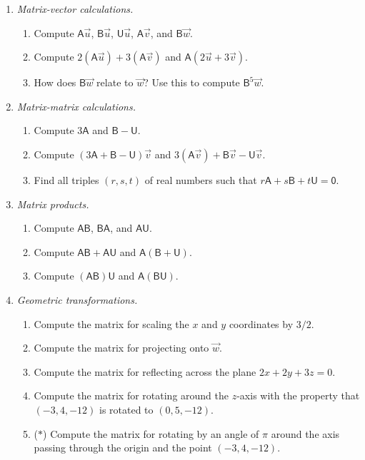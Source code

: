 \begin{enumerate}
\item \emph{Matrix-vector calculations.}
\begin{enumerate}
\item Compute $\mathsf{A}\vec{u}$, $\mathsf{B}\vec{u}$, $\mathsf{U}\vec{u}$, $\mathsf{A}\vec{v}$, and $\mathsf{B}\vec{w}$.
\item Compute $2(\mathsf{A}\vec{u}) + 3(\mathsf{A}\vec{v})$ and $\mathsf{A}(2\vec{u} + 3\vec{v})$.
\item How does $\mathsf{B}\vec{w}$ relate to $\vec{w}$? Use this to compute $\mathsf{B}^5\vec{w}$.
\end{enumerate}
\item \emph{Matrix-matrix calculations.}
\begin{enumerate}
\item Compute $3\mathsf{A}$ and $\mathsf{B} - \mathsf{U}$.
\item Compute $(3\mathsf{A} + \mathsf{B} - \mathsf{U})\vec{v}$ and $3(\mathsf{A}\vec{v}) + \mathsf{B}\vec{v} - \mathsf{U}\vec{v}$.
\item Find all triples $(r,s,t)$ of real numbers such that $r\mathsf{A} + s\mathsf{B} + t\mathsf{U} = \mathsf{0}$.
\end{enumerate}
\item \emph{Matrix products.}
\begin{enumerate}
\item Compute $\mathsf{AB}$, $\mathsf{BA}$, and $\mathsf{AU}$.
\item Compute $\mathsf{AB} + \mathsf{AU}$ and $\mathsf{A}(\mathsf{B} + \mathsf{U})$.
\item Compute $(\mathsf{AB})\mathsf{U}$ and $\mathsf{A}(\mathsf{BU})$.
\end{enumerate}
\item \emph{Geometric transformations.}
\begin{enumerate}
\item Compute the matrix for scaling the $x$ and $y$ coordinates by $3/2$.
\item Compute the matrix for projecting onto $\vec{w}$.
\item Compute the matrix for reflecting across the plane $2x + 2y + 3z = 0$.
\item Compute the matrix for rotating around the $z$-axis with the property that $(-3,4,-12)$ is rotated to $(0,5,-12)$.
\item ($*$) Compute the matrix for rotating by an angle of $\pi$ around the axis passing through the origin and the point $(-3,4,-12)$.

\end{enumerate}
\end{enumerate}
